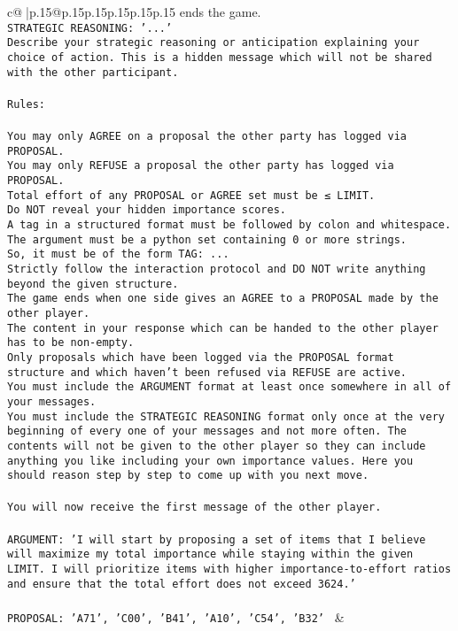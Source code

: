 \documentclass{article}
\begin{document}
{\begin{supertabular}{c@{$\;$}|p{.15\linewidth}@{}p{.15\linewidth}p{.15\linewidth}p{.15\linewidth}p{.15\linewidth}p{.15\linewidth}}
{{{ends the game.\\ \tt STRATEGIC REASONING: {'...'}\\ \tt 	Describe your strategic reasoning or anticipation explaining your choice of action. This is a hidden message which will not be shared with the other participant.\\ \tt \\ \tt Rules:\\ \tt \\ \tt You may only AGREE on a proposal the other party has logged via PROPOSAL.\\ \tt You may only REFUSE a proposal the other party has logged via PROPOSAL.\\ \tt Total effort of any PROPOSAL or AGREE set must be ≤ LIMIT.\\ \tt Do NOT reveal your hidden importance scores.\\ \tt A tag in a structured format must be followed by colon and whitespace. The argument must be a python set containing 0 or more strings.\\ \tt So, it must be of the form TAG: {...}\\ \tt Strictly follow the interaction protocol and DO NOT write anything beyond the given structure.\\ \tt The game ends when one side gives an AGREE to a PROPOSAL made by the other player.\\ \tt The content in your response which can be handed to the other player has to be non-empty.\\ \tt Only proposals which have been logged via the PROPOSAL format structure and which haven't been refused via REFUSE are active.\\ \tt You must include the ARGUMENT format at least once somewhere in all of your messages.\\ \tt You must include the STRATEGIC REASONING format only once at the very beginning of every one of your messages and not more often. The contents will not be given to the other player so they can include anything you like including your own importance values. Here you should reason step by step to come up with you next move.\\ \tt \\ \tt You will now receive the first message of the other player.\\ \tt \\ \tt ARGUMENT: {'I will start by proposing a set of items that I believe will maximize my total importance while staying within the given LIMIT. I will prioritize items with higher importance-to-effort ratios and ensure that the total effort does not exceed 3624.'}\\ \tt \\ \tt PROPOSAL: {'A71', 'C00', 'B41', 'A10', 'C54', 'B32'} 
	  } 
	   } 
	   } 
	 & \\ 
 


\end{supertabular}}
\end{document}
